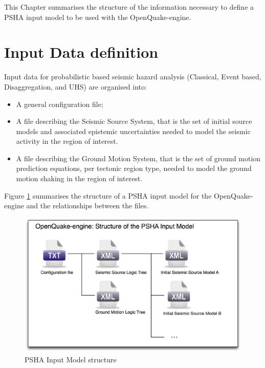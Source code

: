 This Chapter summarises the structure of the information necessary 
to define a PSHA input model to be used with the OpenQuake-engine.
\section{Input Data definition}
\label{sec:hazInputData}
Input data for probabilistic based seismic hazard analysis (Classical, 
Event based, Disaggregation, and UHS) are organised into:
\begin{itemize}
\item A general configuration file;
\item A file describing the Seismic Source System, that is the set of 
    initial source models and associated epistemic uncertainties needed 
    to model the seismic activity in the region of interest.
\item A file describing the Ground Motion System, that is the set of ground 
    motion prediction equations, per tectonic region type, needed to model 
    the ground motion shaking in the region of interest.
\end{itemize}
%
Figure \ref{fig:psha_input} summarises the structure of a PSHA input model
for the OpenQuake-engine and the relationships between the files.
\begin{figure}[!ht]
\centering
\includegraphics[width=14cm]{./figures/hazard/psha_input_structure.eps}
\caption{PSHA Input Model structure}
\label{fig:psha_input}
\end{figure}
